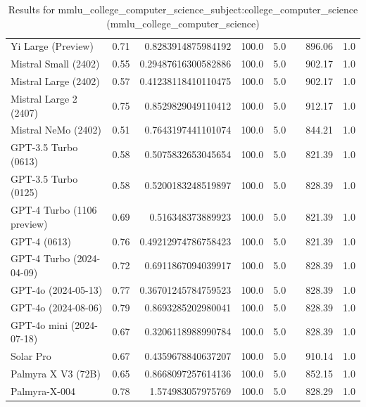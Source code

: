 \begin{table}[htp]
{\begin{tabular}{lrrrrrrr}
Yi Large (Preview) & 0.71 & 0.8283914875984192 & 100.0 & 5.0 &  & 896.06 & 1.0 \\
Mistral Small (2402) & 0.55 & 0.29487616300582886 & 100.0 & 5.0 &  & 902.17 & 1.0 \\
Mistral Large (2402) & 0.57 & 0.41238118410110475 & 100.0 & 5.0 &  & 902.17 & 1.0 \\
Mistral Large 2 (2407) & 0.75 & 0.8529829049110412 & 100.0 & 5.0 &  & 912.17 & 1.0 \\
Mistral NeMo (2402) & 0.51 & 0.7643197441101074 & 100.0 & 5.0 &  & 844.21 & 1.0 \\
GPT-3.5 Turbo (0613) & 0.58 & 0.5075832653045654 & 100.0 & 5.0 &  & 821.39 & 1.0 \\
GPT-3.5 Turbo (0125) & 0.58 & 0.5200183248519897 & 100.0 & 5.0 &  & 828.39 & 1.0 \\
GPT-4 Turbo (1106 preview) & 0.69 & 0.516348373889923 & 100.0 & 5.0 &  & 821.39 & 1.0 \\
GPT-4 (0613) & 0.76 & 0.49212974786758423 & 100.0 & 5.0 &  & 821.39 & 1.0 \\
GPT-4 Turbo (2024-04-09) & 0.72 & 0.6911867094039917 & 100.0 & 5.0 &  & 828.39 & 1.0 \\
GPT-4o (2024-05-13) & 0.77 & 0.36701245784759523 & 100.0 & 5.0 &  & 828.39 & 1.0 \\
GPT-4o (2024-08-06) & 0.79 & 0.8693285202980041 & 100.0 & 5.0 &  & 828.39 & 1.0 \\
GPT-4o mini (2024-07-18) & 0.67 & 0.3206118988990784 & 100.0 & 5.0 &  & 828.39 & 1.0 \\
Solar Pro & 0.67 & 0.4359678840637207 & 100.0 & 5.0 &  & 910.14 & 1.0 \\
Palmyra X V3 (72B) & 0.65 & 0.8668097257614136 & 100.0 & 5.0 &  & 852.15 & 1.0 \\
Palmyra-X-004 & 0.78 & 1.574983057975769 & 100.0 & 5.0 &  & 828.29 & 1.0 \\
\bottomrule
\end{tabular}}
\caption{Results for mmlu_college_computer_science_subject:college_computer_science (mmlu_college_computer_science)}
\label{fig:mmlu_college_computer_science_subject:college_computer_science (mmlu_college_computer_science)}
\end{table}